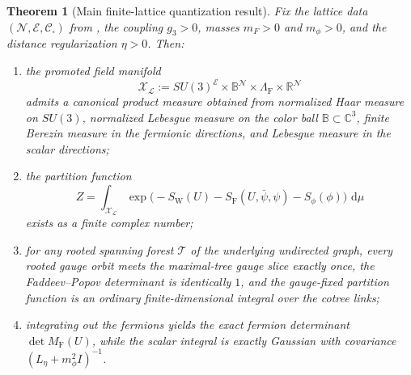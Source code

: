 \documentclass[11pt]{article}
\newtheorem{theorem}{Theorem}[section]
\theoremstyle{remark}
\newcommand{\R}{\mathbb R}
\newcommand{\C}{\mathbb C}
\newcommand{\mcN}{\mathcal N}
\newcommand{\mcE}{\mathcal E}
\newcommand{\mcT}{\mathcal T}
\newcommand{\mcX}{\mathscr X}
\newcommand{\bbB}{\mathbb B}
\newcommand{\dd}{\,\mathrm d}
\begin{document}
\begin{theorem}[Main finite-lattice quantization result]
\label{thm:main}
Fix the lattice data $(\mcN,\mcE,\mathcal C_\square)$ from \cite{continuumqft},
the coupling $g_3>0$, masses $m_F>0$ and $m_\phi>0$, and the distance
regularization $\eta>0$.  Then:
\begin{enumerate}[leftmargin=1.5em]
\item the promoted field manifold
\[
\mcX_\mathcal L:=SU(3)^{\mcE}\times \bbB^{\mcN}\times \Lambda_{\mathrm F}\times \R^{\mcN}
\]
admits a canonical product measure obtained from normalized Haar measure on
$SU(3)$, normalized Lebesgue measure on the color ball $\bbB\subset\C^3$,
finite Berezin measure in the fermionic directions, and Lebesgue measure in the
scalar directions;
\item the partition function
\[
Z=\int_{\mcX_\mathcal L}\exp\!\bigl(-S_{\mathrm W}(U)-S_{\mathrm F}(U,\bar\psi,\psi)-S_\phi(\phi)\bigr)\,\dd\mu
\]
exists as a finite complex number;
\item for any rooted spanning forest $\mcT$ of the underlying undirected graph,
every rooted gauge orbit meets the maximal-tree gauge slice exactly once, the
Faddeev--Popov determinant is identically $1$, and the gauge-fixed partition
function is an ordinary finite-dimensional integral over the cotree links;
\item integrating out the fermions yields the exact fermion determinant
$\det M_{\mathrm F}(U)$, while the scalar integral is exactly Gaussian with
covariance $(L_\eta+m_\phi^2 I)^{-1}$.
\end{enumerate}
\end{theorem}
\end{document}

